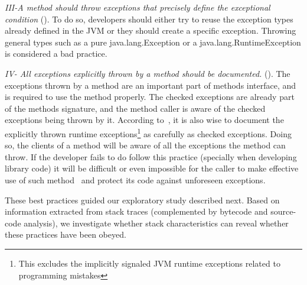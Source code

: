 \documentclass[conference]{IEEEtran}
\begin{document}

\emph{III-A method should throw exceptions that precisely define the
exceptional condition} (\cite{gosling2000java,bloch2008effective}). To do so,
developers should either try to reuse the exception types already defined in the
JVM or they should create a specific exception. Throwing general types such as a
pure java.lang.Exception or a java.lang.RuntimeException is considered a bad practice.



\emph{IV- All exceptions explicitly thrown by a method should be documented.}
(\cite{mandrioli1992advances,gosling2000java,wirfs2006toward,bloch2008effective}).
The exceptions thrown by a method are an important part of methods interface,
and is required to use the method properly. The checked exceptions are already
part of the  methods signature, and the method caller is aware of the checked
exceptions being thrown by it. According to~\cite{bloch2008effective}, it is
also wise to document the explicitly thrown runtime exceptions\footnote{This
excludes the implicitly signaled JVM runtime exceptions related to programming
mistakes} as carefully as checked exceptions. Doing so, the clients of a method
will be aware of all the exceptions the method can throw. If the developer fails to
do follow this practice (specially when developing library code) it will be
difficult or even impossible for the caller to make effective use of such 
method~\cite{wirfs2006toward, bloch2008effective} and protect its code
against unforeseen exceptions. 

These best practices guided our exploratory study described next.
Based on information extracted from stack traces (complemented by
bytecode and source-code analysis), we investigate whether stack characteristics
can reveal whether these practices have been obeyed. 
\end{document}

